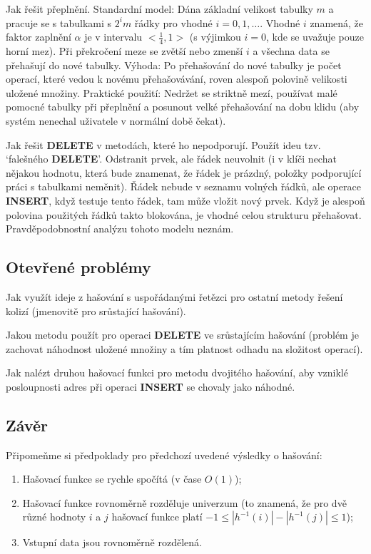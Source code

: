 \documentclass[a4paper,12pt]{article}
\begin{document}
Jak řešit přeplnění.\newline 
Standardní model: Dána základní velikost tabulky $m$ a 
pracuje se s tabulkami s $2^im$ řádky pro vhodné 
$i=0,1,\dots$. Vhodné $i$ znamená, že faktor zaplnění $
\alpha$ je v 
intervalu $<\frac 14,1>$ (s výjimkou $i=0$, kde se uvažuje 
pouze horní mez). Při překro\-če\-ní meze se zvětší nebo 
zmenší $i$ a všechna data se přehašují do nové 
tabulky.\newline 
Výhoda: Po přehašování do nové tabulky je počet operací, 
které vedou k novému přehašová\-vá\-ní, roven alespoň polovině 
velikosti uložené množiny.\newline 
Praktické použití: Nedržet se striktně mezí, používat 
malé pomocné ta\-bul\-ky při přeplnění a posunout velké 
přehašování na dobu klidu (aby systém nenechal uživatele v 
normální době čekat).

Jak řešit {\bf DELETE} v metodách, které ho 
nepodporují.\newline 
Použít ideu tzv. `falešného {\bf DELETE}'. 
Odstranit prvek, ale řádek neuvolnit (i v klíči nechat 
nějakou hodnotu, která bude znamenat, že řádek je 
prázdný, položky podporující práci s tabulkami neměnit). 
Řádek nebude v seznamu volných řádků, ale 
operace {\bf INSERT}, když testuje tento řádek, tam 
může vložit nový prvek. Když je alespoň 
polovina použitých řádků takto blokována, je 
vhodné celou strukturu přehašovat. Prav\-děpodobnostní 
analýzu tohoto modelu neznám.

\subsection{
Otevřené problémy
}

Jak využít ideje z hašování s uspořádanými 
řetězci pro ostatní metody řešení kolizí 
(jmeno\-vitě pro srůstající hašování).

Jakou metodu použít pro operaci {\bf DELETE} ve 
srůstajícím hašování (problém je zachovat náhodnost 
uložené množiny a tím platnost odhadu na složitost operací). 

Jak nalézt druhou hašovací funkci pro metodu 
dvojitého hašo\-vá\-ní, aby vzniklé posloupnosti adres při operaci 
{\bf INSERT} se chovaly jako náhodné.

\subsection{
Závěr
}

Připomeňme si předpoklady pro předchozí uvedené 
výsledky o hašování:
\begin{enumerate}
\item
Hašovací funkce se rychle spočítá (v čase 
$O(1)$);
\item Hašovací funkce rovnoměrně rozděluje univerzum (to 
znamená, že pro dvě různé hodnoty $i$ a $j$ 
hašovací funkce platí $-1\le |h^{-1}(i)|-|h^{-1}(j)|\le 
1$); 
\item
Vstupní data jsou rovnoměrně rozdělená.
\end{enumerate}
\end{document}
